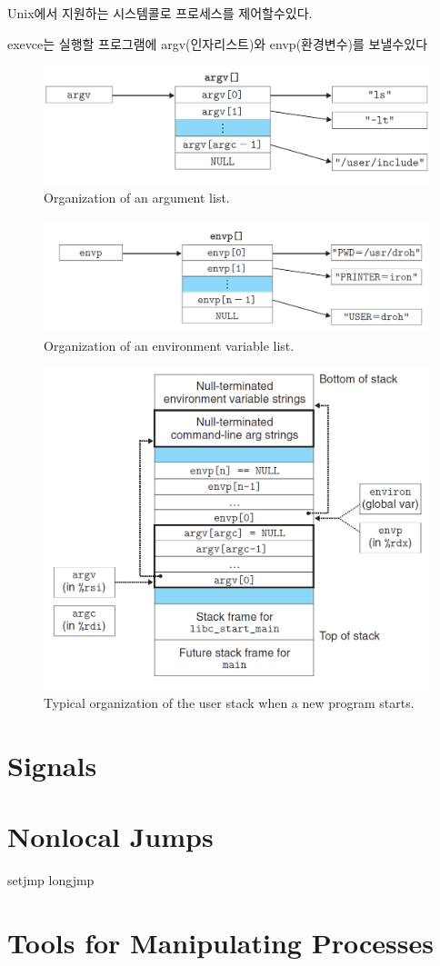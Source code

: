 Unix에서 지원하는 시스템콜로 프로세스를 제어할수있다.


exevce는 실행할 프로그램에 argv(인자리스트)와  envp(환경변수)를 보낼수있다

\begin{figure}[h!]
    \centering
    \includegraphics[scale=0.5]{pic/section8/pic1}
    \caption{Organization of an argument list.}
\end{figure}


\begin{figure}[h!]
    \centering
    \includegraphics[scale=0.47]{pic/section8/pic2}
    \caption{Organization of an environment variable list.}
\end{figure}

\begin{figure}[h!]
    \centering
    \includegraphics[scale=0.5]{pic/section8/pic3}
    \caption{Typical organization of the user stack when a    new program starts.}
\end{figure}



\section{Signals}


\section{Nonlocal Jumps}

setjmp longjmp

\section{Tools for Manipulating Processes}
